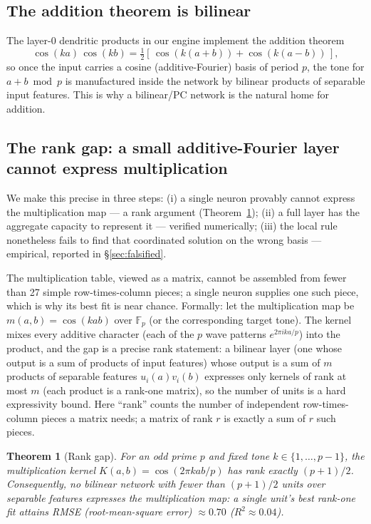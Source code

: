 \documentclass[11pt]{article}
\newtheorem{theorem}{Theorem}
\begin{document}
\subsection{The addition theorem is bilinear}\label{sec:addition-theorem}
The layer-0 dendritic products in our engine implement the addition theorem
\begin{equation}\label{eq:addthm}
\cos(ka)\,\cos(kb) = \tfrac{1}{2}\left[\,\cos(k(a+b)) + \cos(k(a-b))\,\right],
\end{equation}
so once the input carries a cosine (additive-Fourier) basis of period $p$, the tone for $a+b \bmod p$ is manufactured inside the network by bilinear products of separable input features. This is why a bilinear/PC network is the natural home for addition.

\subsection{The rank gap: a small additive-Fourier layer cannot express multiplication}\label{sec:rankgap}
We make this precise in three steps: (i) a single neuron provably cannot express the multiplication map --- a rank argument (Theorem~\ref{thm:rankgap}); (ii) a full layer has the aggregate capacity to represent it --- verified numerically; (iii) the local rule nonetheless fails to find that coordinated solution on the wrong basis --- empirical, reported in \S\ref{sec:falsified}.

The multiplication table, viewed as a matrix, cannot be assembled from fewer than 27 simple row-times-column pieces; a single neuron supplies one such piece, which is why its best fit is near chance. Formally: let the multiplication map be $m(a,b) = \cos(kab)$ over $\mathbb{F}_p$ (or the corresponding target tone). The kernel mixes every additive character (each of the $p$ wave patterns $e^{2\pi i k a/p}$) into the product, and the gap is a precise rank statement: a bilinear layer (one whose output is a sum of products of input features) whose output is a sum of $m$ products of separable features $u_i(a)v_i(b)$ expresses only kernels of rank at most $m$ (each product is a rank-one matrix), so the number of units is a hard expressivity bound. Here ``rank'' counts the number of independent row-times-column pieces a matrix needs; a matrix of rank $r$ is exactly a sum of $r$ such pieces.

\begin{theorem}[Rank gap]\label{thm:rankgap}
For an odd prime $p$ and fixed tone $k \in \{1, \dots, p-1\}$, the multiplication kernel $K(a,b) = \cos(2\pi k ab / p)$ has rank exactly $(p+1)/2$. Consequently, no bilinear network with fewer than $(p+1)/2$ units over separable features expresses the multiplication map: a single unit's best rank-one fit attains RMSE (root-mean-square error) $\approx 0.70$ ($R^2 \approx 0.04$).
\end{theorem}
\end{document}
